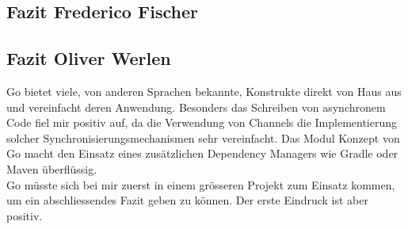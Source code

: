 \documentclass[12pt,titlepage]{article}
\begin{document}
\subsection{Fazit Frederico Fischer}

\subsection{Fazit Oliver Werlen}
Go bietet viele, von anderen Sprachen bekannte, Konstrukte direkt von Haus aus und vereinfacht deren Anwendung. Besonders das Schreiben von asynchronem Code fiel mir positiv auf, da die Verwendung von Channels die Implementierung solcher Synchronisierungsmechanismen sehr vereinfacht. Das Modul Konzept von Go macht den Einsatz eines zusätzlichen Dependency Managers wie Gradle oder Maven überflüssig. \\
Go müsste sich bei mir zuerst in einem grösseren Projekt zum Einsatz kommen, um ein abschliessendes Fazit geben zu können. Der erste Eindruck ist aber positiv.  

    
\end{document}
